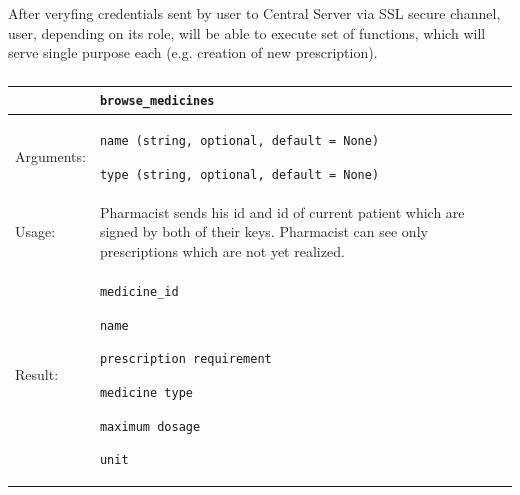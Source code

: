 \chapter{}

\section{}
After veryfing credentials sent by user to Central Server via SSL secure channel, user, depending on its role, will be able to execute set of functions, which will serve single purpose each (e.g. creation of new prescription).

\subsection{}
\small
    \begin{longtable}{| p{3cm} | p{10.75cm} |}
    \hline
     & \texttt{browse\_medicines} \\ \hline
    Arguments: &  \begin{packed_enum}

    \item \texttt{name (string, optional, default = None)}
    \item \texttt{type (string, optional, default = None)}
	\end{packed_enum}        \\ \hline
    Usage: & Pharmacist sends his id and id of current patient which are signed by both of their keys. Pharmacist can see only prescriptions which are not yet realized. \\ \hline
    Result: & \begin{packed_enum}
    	\item \texttt{medicine\_id}
    	\item \texttt{name}
    	\item \texttt{prescription requirement}
    	\item \texttt{medicine type}
    	\item \texttt{maximum dosage}
    	\item \texttt{unit}
	\end{packed_enum}     \\ \hline	
    \end{longtable}

